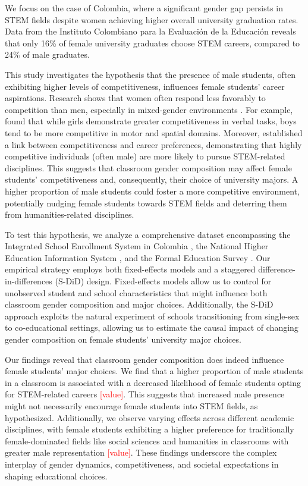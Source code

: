 We focus on the case of Colombia, where a significant gender gap persists in STEM fields despite women achieving higher overall university graduation rates. Data from the Instituto Colombiano para la Evaluación de la Educación \citep{ICFES2019} reveals that only 16\% of female university graduates choose STEM careers, compared to 24\% of male graduates. 

This study investigates the hypothesis that the presence of male students, often exhibiting higher levels of competitiveness, influences female students' career aspirations. Research shows that women often respond less favorably to competition than men, especially in mixed-gender environments \citep{Niederle2011}.  For example, \citet{Gindi2019} found that while girls demonstrate greater competitiveness in verbal tasks, boys tend to be more competitive in motor and spatial domains. Moreover, \citet{Thomas2014} established a link between competitiveness and career preferences, demonstrating that highly competitive individuals (often male) are more likely to pursue STEM-related disciplines. This suggests that classroom gender composition may affect female students' competitiveness and, consequently, their choice of university majors. A higher proportion of male students could foster a more competitive environment, potentially nudging female students towards STEM fields and deterring them from humanities-related disciplines.

To test this hypothesis, we analyze a comprehensive dataset encompassing the Integrated School Enrollment System in Colombia \citep{SIMAT}, the National Higher Education Information System \citep{SNIES}, and the Formal Education Survey \citep{EDUC}.  Our empirical strategy employs both fixed-effects models and a staggered difference-in-differences (S-DiD) design. Fixed-effects models allow us to control for unobserved student and school characteristics that might influence both classroom gender composition and major choices. Additionally, the S-DiD approach exploits the natural experiment of schools transitioning from single-sex to co-educational settings, allowing us to estimate the causal impact of changing gender composition on female students' university major choices.

Our findings reveal that classroom gender composition does indeed influence female students' major choices. We find that a higher proportion of male students in a classroom is associated with a decreased likelihood of female students opting for STEM-related careers \textcolor{red}{[value]}.  This suggests that increased male presence might not necessarily encourage female students into STEM fields, as hypothesized. Additionally, we observe varying effects across different academic disciplines, with female students exhibiting a higher preference for traditionally female-dominated fields like social sciences and humanities in classrooms with greater male representation \textcolor{red}{[value]}. These findings underscore the complex interplay of gender dynamics, competitiveness, and societal expectations in shaping educational choices.

